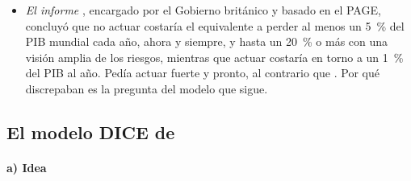 \documentclass[11pt]{article}
\begin{document}
\begin{itemize}
\begin{itemize}
  \item \emph{Para qué sirve}: en el óptimo es el impuesto pigouviano por tonelada, $t^*_t=\mathrm{CSC}_t$; y sirve para el análisis coste-beneficio de cualquier regulación o inversión que cambie las emisiones .
  \item \emph{Cuánto vale}:
    \begin{itemize}
    \item el DICE-2023 lo estima en 66~\$ por tonelada para las emisiones de 2020 con las políticas actuales, y en 50~\$ en la senda óptima, en dólares de 2019\nocite{BarrageNordhaus2024DICE};
    \item la Agencia de Protección del Medio Ambiente de Estados Unidos (EPA) lo elevó en 2023 a 190~\$, con un descuento del 2~\% y la nueva literatura de daños\nocite{EPA2023SCGHG,Rennert2022Comprehensive};
    \item en 2025, la nueva Administración dejó de usar una cifra oficial y limitó el análisis de las emisiones a lo que exija la ley\nocite{OMB2025M2527}: el coste social del carbono es también una decisión política.
    \end{itemize}
  \end{itemize}
  \begin{itemize}
  \item Volvamos a la tonelada de la acería: según el modelo y el descuento, el daño que causa vale entre 50~y 190~\$. Si nadie lo paga, el acero sale barato para la acería y caro para el mundo.
  \end{itemize}
\item \emph{El informe }, encargado por el Gobierno británico y basado en el PAGE, concluyó que no actuar costaría el equivalente a perder al menos un 5~\% del PIB mundial cada año, ahora y siempre, y hasta un 20~\% o más con una visión amplia de los riesgos, mientras que actuar costaría en torno a un 1~\% del PIB al año\nocite{Stern2007Economics}. Pedía actuar fuerte y pronto, al contrario que . Por qué discrepaban es la pregunta del modelo que sigue.
\end{itemize}

\subsection{El modelo DICE de }\label{sec:dice}

\paragraph{a) Idea}
\end{document}
